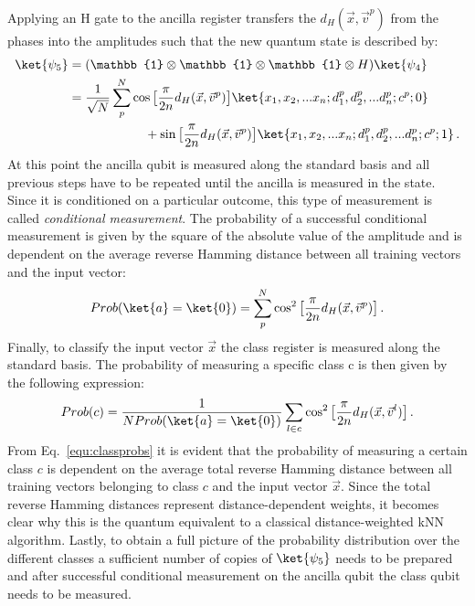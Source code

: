 Applying an H gate to the ancilla register transfers the $d_H(\vec{x},\vec{v}^p)$ from the phases into the amplitudes such that the new quantum state is described by:
\begin{align}
\label{equ:beforecm}
\ket{\psi_5} &= (\mathbb{1} \otimes \mathbb{1} \otimes \mathbb{1} \otimes H)\ket{\psi_4}\notag\\
&= \frac{1}{\sqrt{N}}\sum_p^N \cos\big[\frac{\pi}{2n}d_H(\vec{x},\vec{v}^p)\big] \ket{x_1,x_2,...x_n;d_1^p,d_2^p,...d_n^p;c^p;0} \notag\\
&\quad\quad\quad\quad\quad\quad + \sin\big[\frac{\pi}{2n}d_H(\vec{x},\vec{v}^p)\big] \ket{x_1,x_2,...x_n;d_1^p,d_2^p,...d_n^p;c^p;1}\, .
\end{align}
At this point the ancilla qubit is measured along the standard basis and all previous steps have to be repeated until the ancilla is measured in the \0 state. Since it is conditioned on a particular outcome, this type of measurement is called \emph{conditional measurement}. The probability of a successful conditional measurement is given by the square of the absolute value of the amplitude and is dependent on the average reverse Hamming distance between all training vectors and the input vector:
\begin{equation}
Prob(\ket{a} = \ket{0}) = \sum_p^N \cos^2\big[\frac{\pi}{2n}d_H(\vec{x},\vec{v}^p)\big]\, .
\end{equation}
Finally, to classify the input vector $\vec{x}$ the class register is measured along the standard basis. The probability of measuring a specific class c is then given by the following expression:
\begin{equation}
\label{equ:classprobs}
Prob(c) = \frac{1}{NProb(\ket{a} = \ket{0})} \sum_{l \in c} \cos^2\big[\frac{\pi}{2n}d_H(\vec{x},\vec{v}^l)\big]\, .
\end{equation}
From Eq.~\ref{equ:classprobs} it is evident that the probability of measuring a certain class $c$ is dependent on the average total reverse Hamming distance between all training vectors belonging to class $c$ and the input vector $\vec{x}$. Since the total reverse Hamming distances represent distance-dependent weights, it becomes clear why this is the quantum equivalent to a classical distance-weighted kNN algorithm. Lastly, to obtain a full picture of the probability distribution over the different classes a sufficient number of copies of $\ket{\psi_5}$ needs to be prepared and after successful conditional measurement on the ancilla qubit the class qubit needs to be measured.
